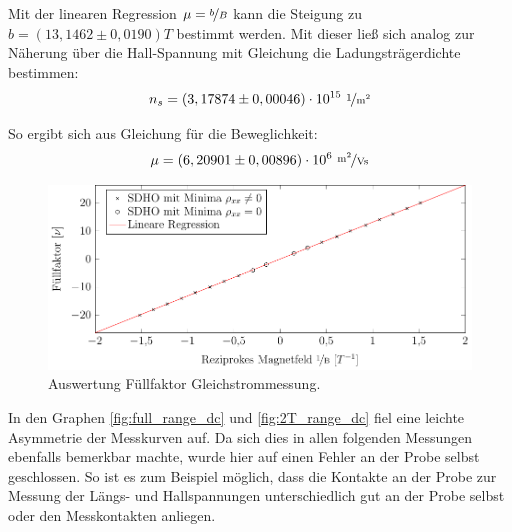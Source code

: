 Mit der linearen Regression $\mu = \nicefrac{b}{B}$ kann die Steigung zu $b=(13,1462 \pm 0,0190)\unit{T}$ bestimmt werden. Mit dieser ließ sich analog zur Näherung über die Hall-Spannung mit Gleichung %
die Ladungsträgerdichte bestimmen:
\begin{equation}
n_s=  ( 3,17874 \pm 0,00046) \cdot 10^{15} ~ \unitfrac{1}{m^2}\\ %
\end{equation}

So ergibt sich aus Gleichung %
für die Beweglichkeit:
\begin{equation}
\mu= (6,20901\pm 0,00896)\cdot 10^6 ~ \unitfrac{m^2}{Vs} %
\end{equation}
 

\begin{figure}[h]
	\centering
	\includegraphics{graphs/dc/auswertung.pdf}
	\caption[Auswertung Füllfaktor Gleichstrommessung]{
		Auswertung Füllfaktor Gleichstrommessung.
	}
	\label{fig:dc_sdho_ausw}
\end{figure}

In den Graphen \ref{fig:full_range_dc} und \ref{fig:2T_range_dc} fiel eine leichte Asymmetrie der Messkurven auf. Da sich dies in allen folgenden Messungen ebenfalls bemerkbar machte, wurde hier auf einen Fehler an der Probe selbst geschlossen. So ist es zum Beispiel möglich, dass die Kontakte an der Probe zur Messung der Längs- und Hallspannungen unterschiedlich gut an der Probe selbst oder den Messkontakten anliegen. 